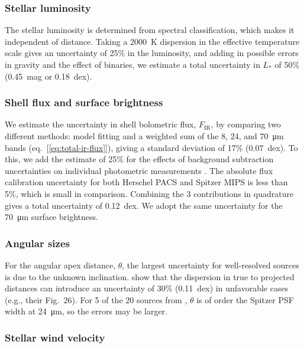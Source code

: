 \subsubsection{Stellar luminosity}
\label{sec:stellar-luminosity}

The stellar luminosity is determined from spectral classification,
which makes it independent of distance.  Taking a \SI{2000}{K}
dispersion in the effective temperature scale \citep{Martins:2005a}
gives an uncertainty of 25\% in the luminosity, and adding in possible
errors in gravity and the effect of binaries, we estimate a total
uncertainty in \(L_*\) of 50\% (0.45~mag or 0.18~dex).

\subsubsection{Shell flux and surface brightness}
\label{sec:shell-flux-surface}

We estimate the uncertainty in shell bolometric flux,
\(F_{\text{IR}}\), by comparing two different methods: model fitting
\citep{Kobulnicky:2017a} and a weighted sum of the 8, 24, and
\SI{70}{\um} bands (eq.~[\ref{eq:total-ir-flux}]), giving a standard
deviation of 17\% (0.07~dex).  To this, we add the estimate of 25\%
for the effects of background subtraction uncertainties on individual
photometric measurements \citep{Kobulnicky:2017a}. The absolute flux
calibration uncertainty for both Herschel PACS \citep{Balog:2014a} and
Spitzer MIPS \citep{Engelbracht:2007a} is less than 5\%, which is
small in comparison. Combining the 3 contributions in quadrature gives
a total uncertainty of 0.12~dex.  We adopt the same uncertainty for
the \SI{70}{\um} surface brightness.

\subsubsection{Angular sizes}
\label{sec:angular-sizes}

For the angular apex distance, \(\theta\), the largest uncertainty for
well-resolved sources is due to the unknown inclination.
\citet{Tarango-Yong:2018a} show that the dispersion in true to
projected distances can introduce an uncertainty of \(30\%\)
(0.11~dex) in unfavorable cases (e.g., their Fig.~26).  For 5 of the
20 sources from \citet{Kobulnicky:2018a}, \(\theta\) is of order the
Spitzer PSF width at \SI{24}{\um}, so the errors may be larger.

\subsubsection{Stellar wind velocity}
\label{sec:stell-wind-veloc}

